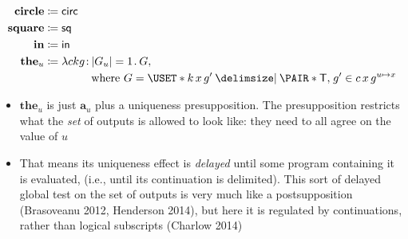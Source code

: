 \documentclass[10pt,fleqn]{article}
\begin{document}
\dotbreak

\begin{minipage}[t]{0.5\textwidth} %
\begin{spreadlines}{0pt}
\begin{align*}
  \textbf{circle} &\coloneq
  \cn{circ} \\
  \textbf{square} &\coloneq
  \cn{sq} \\
  \textbf{in} &\coloneq
  \cn{in} \\
  \textbf{the}_u &\coloneq
    \l ckg \col |G_u| = 1 \dt G, \\
  &\hphantom{{}\coloneq \l ckg \col}
    \text{where}\ 
    G = \uset{k\,x\,g' \giv \pair{\cn{T}}{g'} \in c\,x\,g^{u\mapsto x}} \\
\end{align*}  
\end{spreadlines}
\end{minipage}
%
%
\begin{minipage}[t]{0.5\textwidth} %
\begin{spreadlines}{0pt}
\begin{itemize}
  \item
    $\textbf{the}_u$ is just $\textbf{a}_u$ plus a uniqueness presupposition.
    The presupposition restricts what the \emph{set} of outputs is allowed to
    look like: they need to all agree on the value of $u$
  \item
    That means its uniqueness effect is \emph{delayed} until some program
    containing it is evaluated, (i.e., until its continuation is delimited).
    This sort of delayed global test on the set of outputs is very much like a
    postsupposition (Brasoveanu 2012, Henderson 2014), but here it is
    regulated by continuations, rather than logical subscripts (Charlow 2014)
\end{itemize}
\end{spreadlines}
\end{minipage}

\dotbreak
\end{document}
